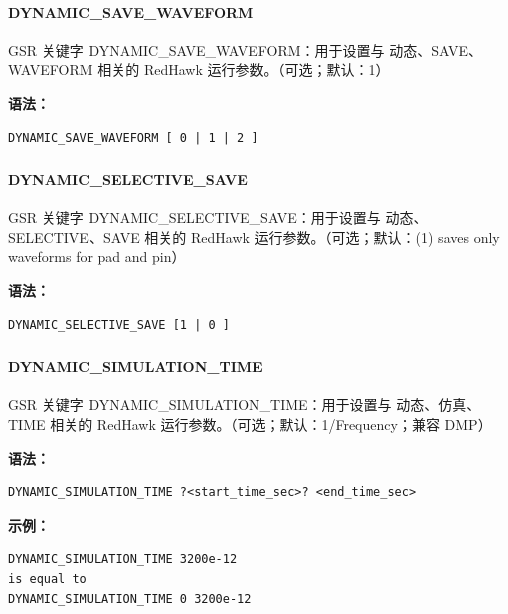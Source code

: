 \paragraph*{DYNAMIC_SAVE_WAVEFORM}

GSR 关键字 DYNAMIC_SAVE_WAVEFORM：用于设置与 动态、SAVE、WAVEFORM 相关的 RedHawk 运行参数。（可选；默认：1）

\textbf{语法：}
\begin{lstlisting}
DYNAMIC_SAVE_WAVEFORM [ 0 | 1 | 2 ]
\end{lstlisting}

\subsubsection{}
\paragraph*{DYNAMIC_SELECTIVE_SAVE}

GSR 关键字 DYNAMIC_SELECTIVE_SAVE：用于设置与 动态、SELECTIVE、SAVE 相关的 RedHawk 运行参数。（可选；默认：(1) saves only waveforms for pad and pin）

\textbf{语法：}
\begin{lstlisting}
DYNAMIC_SELECTIVE_SAVE [1 | 0 ]
\end{lstlisting}

\subsubsection{}
\paragraph*{DYNAMIC_SIMULATION_TIME}

GSR 关键字 DYNAMIC_SIMULATION_TIME：用于设置与 动态、仿真、TIME 相关的 RedHawk 运行参数。（可选；默认：1/Frequency；兼容 DMP）

\textbf{语法：}
\begin{lstlisting}
DYNAMIC_SIMULATION_TIME ?<start_time_sec>? <end_time_sec>
\end{lstlisting}

\textbf{示例：}
\begin{lstlisting}
DYNAMIC_SIMULATION_TIME 3200e-12
is equal to
DYNAMIC_SIMULATION_TIME 0 3200e-12
\end{lstlisting}

\subsubsection{}
